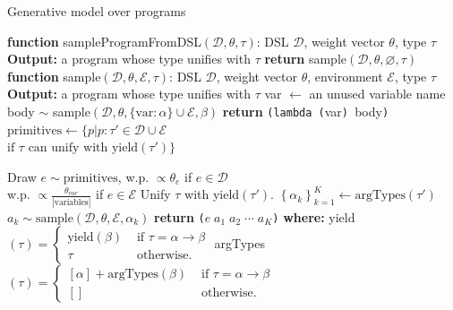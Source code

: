 \documentclass{article}
\newcommand{\code}[1]{{\footnotesize\texttt{#1}}}
\begin{document}
\begin{algorithm}[tb]
   \caption{Generative model over programs}
   \label{programGenerativeModel}
   \begin{algorithmic}
     \STATE \textbf{function} sampleProgramFromDSL$(\mathcal{D}, \theta, \tau)$:
   DSL $\mathcal{D}$, weight vector $\theta$, type $\tau$
  \STATE \textbf{Output:} a program whose type unifies with $\tau$
  \STATE \textbf{return} sample$(\mathcal{D}, \theta, \varnothing, \tau)$
\STATE
     \STATE \textbf{function} sample$(\mathcal{D}, \theta, \mathcal{E}, \tau)$:
   DSL $\mathcal{D}$, weight vector $\theta$, environment $\mathcal{E}$, type $\tau$
  \STATE \textbf{Output:} a program whose type unifies with $\tau$
  \IF{$\tau = \alpha\to\beta$}
  \STATE var $\gets$ an unused variable name
  \STATE body $\sim$ sample$(\mathcal{D},\theta,\{\text{var}:\alpha\}\cup\mathcal{E},\beta)$
   \STATE \textbf{return} \code{(lambda (}var\code{) }body\code{)}
   \ENDIF
   \STATE $\text{primitives} \gets\{p | p: \tau' \in \mathcal{D}\cup\mathcal{E}$ \\
      \hspace*{6.9em}$\text{if }\tau\text{ can unify with yield}(\tau') \} $
   
   \STATE Draw $e\sim \text{primitives}$, w.p. $\propto\theta_e$ if $e\in \mathcal{D}$ \\
      \hspace*{8.8em}w.p. $\propto\frac{\theta_{var}}{|\text{variables}|}$ if $e\in \mathcal{E}$
   \STATE Unify $\tau$ with yield$(\tau')$.
   \STATE $\left\{\alpha_k \right\}_{k = 1}^K\gets\text{argTypes}(\tau')$ 
 \STATE $a_k\sim\text{sample}(\mathcal{D},\theta,\mathcal{E},\alpha_k)$
 \ENDFOR
 \STATE \textbf{return} \code{(}$e\;a_1\; a_2\; \cdots\; a_K$\code{)}
 \STATE\textbf{where:}
 \STATE \quad yield$(\tau) = \begin{cases}
   \text{yield}(\beta)   &\text{ if }\tau = \alpha\to \beta\\
   \tau   &\text{ otherwise.}
 \end{cases}$ 
 \STATE \quad argTypes$(\tau) = \begin{cases}
   [\alpha] + \text{argTypes}(\beta)   &\text{ if }\tau = \alpha\to \beta\\
   []   &\text{ otherwise.}
 \end{cases}$
\end{algorithmic}
\end{algorithm}
\end{document}
